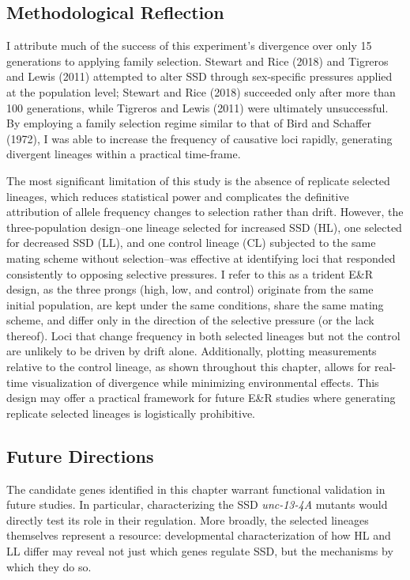 \documentclass[12pt,reqno,oneside]{report}
\begin{document}
\subsection{Methodological Reflection}

I attribute much of the success of this experiment's divergence over only 15 generations to applying family selection. Stewart and Rice (2018) and Tigreros and Lewis (2011) attempted to alter SSD through sex-specific pressures applied at the population level; Stewart and Rice (2018) succeeded only after more than 100 generations, while Tigreros and Lewis (2011) were ultimately unsuccessful. By employing a family selection regime similar to that of Bird and Schaffer (1972), I was able to increase the frequency of causative loci rapidly, generating divergent lineages within a practical time-frame.

The most significant limitation of this study is the absence of replicate selected lineages, which reduces statistical power and complicates the definitive attribution of allele frequency changes to selection rather than drift. However, the three-population design--one lineage selected for increased SSD (HL), one selected for decreased SSD (LL), and one control lineage (CL) subjected to the same mating scheme without selection--was effective at identifying loci that responded consistently to opposing selective pressures. I refer to this as a trident E\&R design, as the three prongs (high, low, and control) originate from the same initial population, are kept under the same conditions, share the same mating scheme, and differ only in the direction of the selective pressure (or the lack thereof). Loci that change frequency in both selected lineages but not the control are unlikely to be driven by drift alone. Additionally, plotting measurements relative to the control lineage, as shown throughout this chapter, allows for real-time visualization of divergence while minimizing environmental effects. This design may offer a practical framework for future E\&R studies where generating replicate selected lineages is logistically prohibitive.

\subsection{Future Directions}

The candidate genes identified in this chapter warrant functional validation in future studies. In particular, characterizing the SSD \textit{unc-13-4A} mutants would directly test its role in their regulation. More broadly, the selected lineages themselves represent a resource: developmental characterization of how HL and LL differ may reveal not just which genes regulate SSD, but the mechanisms by which they do so.
\end{document}
